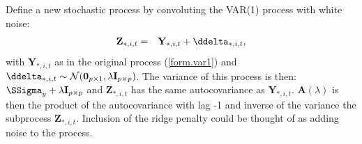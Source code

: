 \documentclass[a4paper]{article}
\theoremstyle{myexamplestyle}
\begin{document}
Define a new stochastic process by convoluting the VAR(1) process with white noise:
\begin{eqnarray} \label{form.var1.modified}
\mathbf{Z}_{\ast, i, t}  & = & \mathbf{Y}_{\ast, i, t} + \ddelta_{\ast, i, t},
\end{eqnarray}
with $\mathbf{Y}_{\ast, i, t}$ as in the original process (\ref{form.var1}) and $\ddelta_{\ast, i, t} \sim \mathcal{N}(\mathbf{0}_{p \times 1}, \lambda \mathbf{I}_{p \times p})$. The variance of this process is then: $\SSigma_y + \lambda \mathbf{I}_{p \times p}$ and $\mathbf{Z}_{\ast, i, t}$ has the same autocovariance as $\mathbf{Y}_{\ast, i, t}$. $\mathbf{A}(\lambda)$ is then the product of the autocovariance with lag -1 and inverse of the variance the subprocess $\mathbf{Z}_{\ast, i, t}$. Inclusion of the ridge penalty could be thought of as adding noise to the process.
\end{document}
